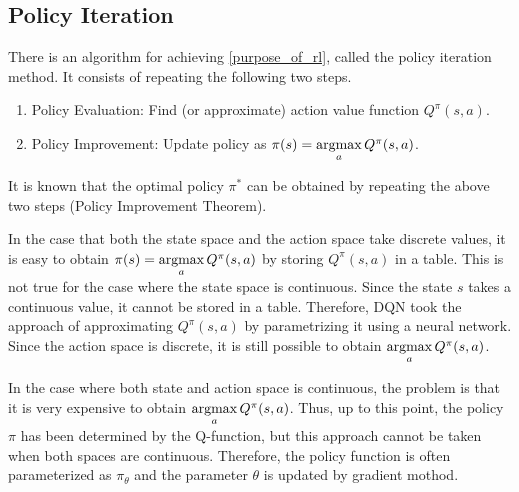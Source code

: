 \documentclass[english, dvipdfmx]{ampmt}             %
\newcommand{\argmax}{\mathop{\rm argmax}\limits}
\begin{document}
\subsection{Policy Iteration}
\label{sec:policy_improvement}
There is an algorithm for achieving \eqref{purpose_of_rl}, called the policy iteration method. It consists of repeating the following two steps.
\begin{enumerate}
	\item Policy Evaluation: Find (or approximate) action value function $Q^{\pi}(s,a)$.
	\item Policy Improvement: Update policy as $\pi(s)=\argmax_aQ^{\pi}(s,a)$.
\end{enumerate}
It is known that the optimal policy $\pi^{*}$ can be obtained by repeating the above two steps (Policy Improvement Theorem\cite{RL}).\par
In the case that both the state space and the action space take discrete values, it is easy to obtain
$\pi(s)=\argmax_aQ^{\pi}(s,a)$ by storing $Q^{\pi}(s,a)$ in a table. This is not true for the case where the state space is continuous. Since the state $s$ takes a continuous value, it cannot be stored in a table. Therefore, DQN\cite{DQN} took the approach of approximating $Q^{\pi}(s,a)$ by parametrizing it using a neural network. Since the action space is discrete, it is still possible to obtain $\argmax_aQ^{\pi}(s,a)$. \par
In the case where both state and action space is continuous, the problem is that it is very expensive to obtain $\argmax_aQ^{\pi}(s,a)$. Thus, up to this point, the policy $\pi$ has been determined by the Q-function, but this approach cannot be taken when both spaces are continuous. 
Therefore, the policy function is often parameterized as $\pi_{\theta}$ and the parameter $\theta$ is updated by gradient mothod. 
\end{document}
